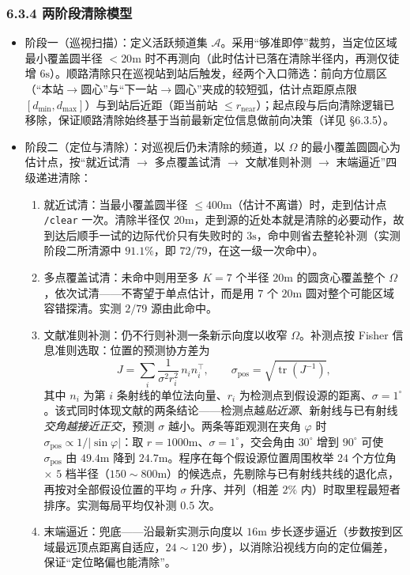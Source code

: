 \documentclass[UTF8, zihao=5,AutoFakeBold=2]{ctexart}
\begin{document}
\subsubsection*{6.3.4 两阶段清除模型}
\begin{itemize}
    \item 阶段一（巡视扫描）：定义活跃频道集 \(\mathcal{A}\)。采用“够准即停”裁剪，当定位区域最小覆盖圆半径 \(<20\text{m}\) 时不再测向（此时估计已落在清除半径内，再测仅徒增 \(6\text{s}\)）。顺路清除只在巡视站到站后触发，经两个入口筛选：前向方位扇区（“本站\(\to\)圆心”与“下一站\(\to\)圆心”夹成的较短弧，估计点距原点限 \([d_{\min},d_{\max}]\)）与到站后近距（距当前站 \(\leq r_{\text{near}}\)）；起点段与后向清除逻辑已移除，保证顺路清除始终基于当前最新定位信息做前向决策（详见 \S6.3.5）。
    \item 阶段二（定位与清除）：对巡视后仍未清除的频道，以 \(\Omega\) 的最小覆盖圆圆心为估计点，按“就近试清 \(\to\) 多点覆盖试清 \(\to\) 文献准则补测 \(\to\) 末端逼近”四级递进清除：
    \begin{enumerate}
        \item 就近试清：当最小覆盖圆半径 \(\le 400\text{m}\)（估计不离谱）时，走到估计点 \texttt{/clear} 一次。清除半径仅 \(20\text{m}\)，走到源的近处本就是清除的必要动作，故到达后顺手一试的边际代价只有失败时的 \(3\text{s}\)，命中则省去整轮补测（实测阶段二所清源中 \(91.1\%\)，即 \(72/79\)，在这一级一次命中）。
        \item 多点覆盖试清：未命中则用至多 \(K=7\) 个半径 \(20\text{m}\) 的圆贪心覆盖整个 \(\Omega\)，依次试清——不寄望于单点估计，而是用 \(7\) 个 \(20\text{m}\) 圆对整个可能区域容错探清。实测 \(2/79\) 源由此命中。
        \item 文献准则补测：仍不行则补测一条新示向度以收窄 \(\Omega\)。补测点按 Fisher 信息准则选取：位置的预测协方差为
        \begin{equation}
            J=\sum_i \frac{1}{\sigma^2 r_i^{2}}\,n_i n_i^{\!\top},\qquad
            \sigma_{\text{pos}}=\sqrt{\operatorname{tr}(J^{-1})},
        \end{equation}
        其中 \(n_i\) 为第 \(i\) 条射线的单位法向量、\(r_i\) 为检测点到假设源的距离、\(\sigma=1^\circ\)。该式同时体现文献的两条结论——检测点越\emph{贴近源}、新射线与已有射线\emph{交角越接近正交}，预测 \(\sigma\) 越小。两条等距观测在夹角 \(\varphi\) 时 \(\sigma_{\text{pos}}\propto 1/|\sin\varphi|\)：取 \(r=1000\text{m}\)、\(\sigma=1^\circ\)，交会角由 \(30^\circ\) 增到 \(90^\circ\) 可使 \(\sigma_{\text{pos}}\) 由 \(49.4\text{m}\) 降到 \(24.7\text{m}\)。程序在每个假设源位置周围枚举 \(24\) 个方位角 \(\times\) \(5\) 档半径（\(150\sim800\text{m}\)）的候选点，先剔除与已有射线共线的退化点，再按对全部假设位置的平均 \(\sigma\) 升序、并列（相差 \(2\%\) 内）时取里程最短者排序。实测每局平均仅补测 \(0.5\) 次。
        \item 末端逼近：兜底——沿最新实测示向度以 \(16\text{m}\) 步长逐步逼近（步数按到区域最远顶点距离自适应，\(24\sim120\) 步），以消除沿视线方向的定位偏差，保证“定位略偏也能清除”。
    \end{enumerate}
\end{itemize}
\end{document}
